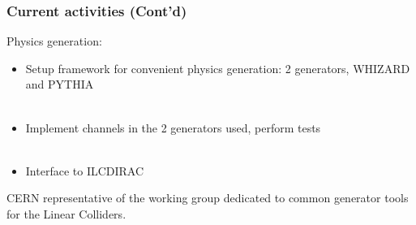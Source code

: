 \documentclass{beamer}
\begin{document}
{

\begin{frame}
\frametitle{Current activities (Cont'd)}
Physics generation:\\
\begin{itemize}
  \item Setup framework for {\color{blue} convenient physics generation}: 2
  generators, WHIZARD and PYTHIA~\\ ~\\
  \item Implement channels in the 2 generators used, perform tests~\\ ~\\
  \item \alert{Interface to ILCDIRAC}
\end{itemize}
CERN representative of the working group dedicated to {\color{blue}common
generator tools for the Linear Colliders}.
\end{frame}
}
\end{document}
